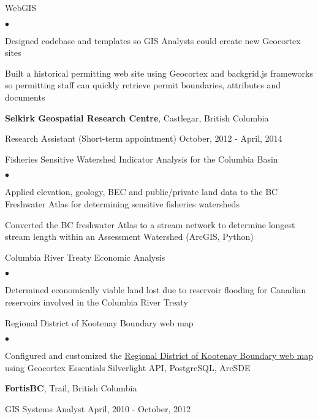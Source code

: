 \documentclass[11pt,margin,line]{res}
\newenvironment{list2}{
  \begin{list}{$\bullet$}{%
      \setlength{\itemsep}{0in}
      \setlength{\parsep}{0in} \setlength{\parskip}{0in}
      \setlength{\topsep}{0in} \setlength{\partopsep}{0in} 
      \setlength{\leftmargin}{0.25in}}}{\end{list}}
\begin{document}
\begin{resume}
{\prj WebGIS}
\vspace{.1cm}
\begin{list2}
\item Designed codebase and templates so GIS Analysts could create new Geocortex sites
\item Built a historical permitting web site using Geocortex and backgrid.js frameworks so permitting staff can quickly retrieve permit boundaries, attributes and documents
\end{list2}

{\bf Selkirk Geospatial Research Centre}, Castlegar, British Columbia

\vspace{-.4cm}
Research Assistant (Short-term appointment) \hfill {\wdates October, 2012 - April, 2014}
  
{\prj Fisheries Sensitive Watershed Indicator Analysis for the Columbia Basin}
\vspace{.1cm}
\begin{list2}
\item Applied elevation, geology, BEC and public/private land data to the BC Freshwater Atlas for determining sensitive fisheries watersheds 
\item Converted the BC freshwater Atlas to a stream network to determine longest stream length within an Assessment Watershed (ArcGIS, Python)
\end{list2}

{\prj Columbia River Treaty Economic Analysis}
\vspace{.1cm}
\begin{list2}
\item Determined economically viable land lost due to reservoir flooding for Canadian reservoirs involved in the Columbia River Treaty
\end{list2}

{\prj Regional District of Kootenay Boundary web map}
\vspace{.1cm}
\begin{list2}
\item Configured and customized the \href{http://rdkb.sgrc.selkirk.ca}{Regional District of Kootenay Boundary web map} using Geocortex Essentials Silverlight API, PostgreSQL, ArcSDE
\end{list2}

{\bf FortisBC}, Trail, British Columbia

\vspace{-.4cm}
GIS Systems Analyst \hfill {\wdates April, 2010 - October, 2012}


\end{resume}
\end{document}

